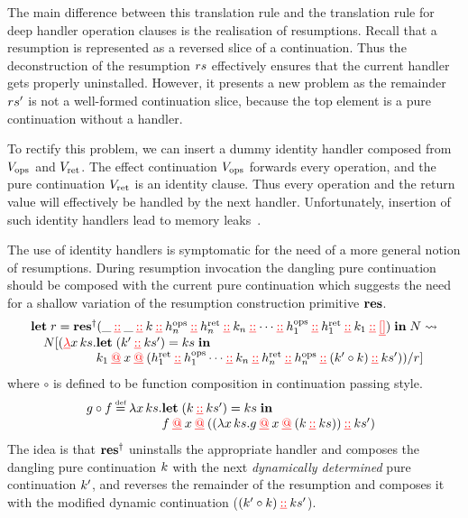 \documentclass[12pt,phd,lfcs,twoside,openright,logo,leftchapter,normalheadings]{infthesis}
\theoremstyle{plain}
\theoremstyle{definition}
\begin{document}
%
The main difference between this translation rule and the translation
rule for deep handler operation clauses is the realisation of
resumptions.
%
Recall that a resumption is represented as a reversed slice of a
continuation. Thus the deconstruction of the resumption $rs$
effectively ensures that the current handler gets properly
uninstalled. However, it presents a new problem as the remainder
$rs'$ is not a well-formed continuation slice, because the top
element is a pure continuation without a handler.
%

To rectify this problem, we can insert a dummy identity handler
composed from $V_{\mathrm{ops}}$ and $V_{\mathrm{ret}}$. The effect continuation $V_{\mathrm{ops}}$
forwards every operation, and the pure continuation $V_{\mathrm{ret}}$ is an
identity clause. Thus every operation and the return value will
effectively be handled by the next handler.
%
Unfortunately, insertion of such identity handlers lead to memory
leaks~\cite{Kiselyov12,HillerstromL18}.
%
%

The use of identity handlers is symptomatic for the need of a more
general notion of resumptions. During resumption invocation the
dangling pure continuation should be composed with the current pure
continuation which suggests the need for a shallow variation of the
resumption construction primitive $\mathbf{res}$.
%
\[
  \bl
    \Let\; r = \Res^\dagger (\_ \dcons \_ \dcons \dk \dcons h_n^{\mathrm{ops}} \dcons h_n^{\mathrm{ret}} \dcons \dk_n \dcons \cdots \dcons h_1^{\mathrm{ops}} \dcons h_1^{\mathrm{ret}} \dcons \dk_1 \dcons \dnil)\;\In\;N \reducesto\\
    \quad N[(\dlam x\,\dhk.
       \ba[t]{@{}l}
          \Let\; (\dk' \dcons \dhk') = \dhk\;\In\\
          \dk_1 \dapp x \dapp (h_1^{\mathrm{ret}} \dcons h_1^{\mathrm{ops}} \cdots \dcons \dk_n \dcons h_n^{\mathrm{ret}} \dcons h_n^{\mathrm{ops}} \dcons (\dk' \circ \dk) \dcons \dhk'))/r]
       \ea
  \el
\]
%
where $\circ$ is defined to be function composition in continuation
passing style.
%
\[
  g \circ f \defas \lambda x\,\dhk.
    \ba[t]{@{}l}
      \Let\;(\dk \dcons \dhk') = \dhk\; \In\\
      f \dapp x \dapp ((\lambda x\,\dhk. g \dapp x \dapp (\dk \dcons \dhk)) \dcons \dhk')
    \ea
\]
%
The idea is that $\mathbf{res}^\dagger$ uninstalls the appropriate handler and
composes the dangling pure continuation $k$ with the next
\emph{dynamically determined} pure continuation $k'$, and reverses
the remainder of the resumption and composes it with the modified
dynamic continuation ($(k' \circ k) \mathbin{{\color{red}\underline{::}}} ks'$).
%
\end{document}
